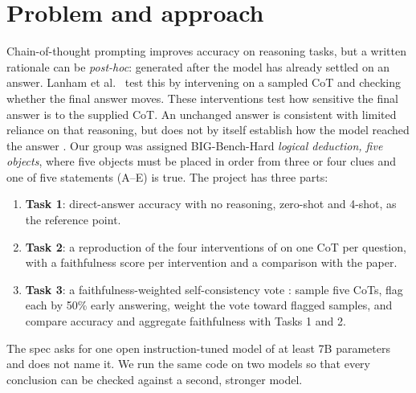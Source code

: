 \documentclass[11pt,a4paper]{article}
\begin{document}
\section{Problem and approach}
Chain-of-thought prompting \cite{wei} improves accuracy on reasoning tasks, but a written rationale can be
\emph{post-hoc}: generated after the model has already settled on an answer. Lanham et al.\ \cite{lanham} test this by
intervening on a sampled CoT and checking whether the final answer moves. These interventions test how sensitive the 
final answer is to the supplied CoT. An unchanged answer is consistent with limited reliance on that reasoning, but 
does not by itself establish how the model reached the answer . Our group was assigned
BIG-Bench-Hard \cite{bbh} \emph{logical deduction, five objects}, where five objects must be placed in order from
three or four clues and one of five statements (A--E) is true. The project has three parts:
\begin{enumerate}
\item \textbf{Task 1}: direct-answer accuracy with no reasoning, zero-shot and 4-shot, as the reference point.
\item \textbf{Task 2}: a reproduction of the four interventions of \cite{lanham} on one CoT per question, with a
faithfulness score per intervention and a comparison with the paper.
\item \textbf{Task 3}: a faithfulness-weighted self-consistency vote \cite{sc}: sample five CoTs, flag each by 50\%
early answering, weight the vote toward flagged samples, and compare accuracy and aggregate faithfulness with Tasks 1
and 2.
\end{enumerate}
The spec asks for one open instruction-tuned model of at least 7B parameters and does not name it. We run the same code
on two models so that every conclusion can be checked against a second, stronger model.
\end{document}
